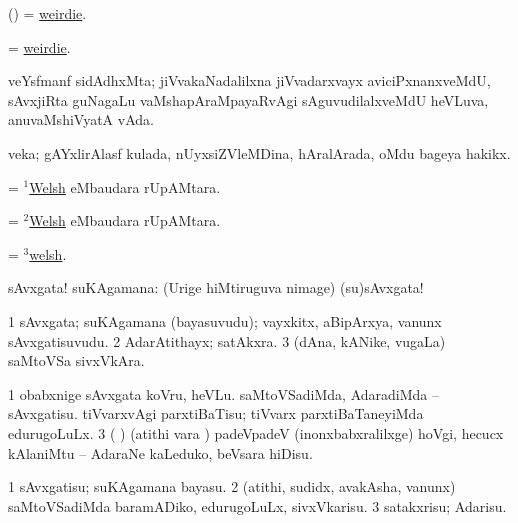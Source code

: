 \bentry
{} 
\gl{\nA}
\bmng
(\AmA) = \hyperlink{weirdie}{weirdie}. 
\emng
\eentry

\bentry
{} 
\gl{\nA}
\expl{}
\bmng
= \hyperlink{weirdie}{weirdie}. 
\emng
\eentry

\bentry
{} 
\gl{\nA}
\expl{}
\bmng
veYsfmanf sidAdhxMta; jiVvakaNadalilxna jiVvadarxvayx aviciPxnanxveMdU, sAvxjiRta guNagaLu vaMshapAraMpayaRvAgi sAguvudilalxveMdU heVLuva, anuvaMshiVyatA vAda. 
\emng
\eentry

\bentry
{} 
\gl{\nA}
\expl{}
\bmng
veka; gAYxlirAlasf kulada, nUyxsiZVleMDina, hAralArada, oMdu bageya hakikx. 
\emng
\eentry

\bentry
{} 
\gl{\gu}
\expl{}
\bmng
= \hyperlink{Welsh(1)}{$^1$Welsh} eMbaudara rUpAMtara. 
\emng
\eentry

\bentry
{} 
\gl{\nA}
\expl{}
\bmng
= \hyperlink{Welsh(2)}{$^2$Welsh} eMbaudara rUpAMtara. 
\emng
\eentry

\bentry
{} 
\gl{\akirx}
\expl{}
\bmng
= \hyperlink{welsh(3)}{$^3$welsh}. 
\emng
\eentry

\bentry
{} 
\gl{\BAavayx}
\expl{}
\bmng
sAvxgata! suKAgamana:  (Urige hiMtiruguva nimage) (su)sAvxgata! 
\emng
\eentry

\bentry
{} 
\gl{\nA}
\expl{}
\bmng
\bnum
\num{1} sAvxgata; suKAgamana (bayasuvudu); vayxkitx, aBipArxya, \mo vanunx sAvxgatisuvudu. 
\num{2} AdarAtithayx; satAkxra. 
\num{3} (dAna, kANike, \mo vugaLa) saMtoVSa sivxVkAra. 
\enum
\emng

\noindent 
\gl{\pagu}
\expl{}
\bmng
\bnum
\num{1}  obabxnige sAvxgata koVru, heVLu. 
  
\banum
{} saMtoVSadiMda, AdaradiMda -- sAvxgatisu. 
 tiVvarxvAgi parxtiBaTisu; tiVvarx parxtiBaTaneyiMda edurugoLuLx. 
\eanum
\numie
\num{3}  (   )  (atithi \mo vara \vi) padeVpadeV (inonxbabxralilxge) hoVgi, hecucx kAlaniMtu -- AdaraNe kaLeduko, beVsara hiDisu. 
\enum
\emng
\eentry

\bentry
{} 
\gl{\sakirx}
\expl{}
\bmng
\bnum
\num{1} sAvxgatisu; suKAgamana bayasu. 
\num{2} (atithi, sudidx, avakAsha, \mo vanunx) saMtoVSadiMda baramADiko, edurugoLuLx, sivxVkarisu. 
\num{3} satakxrisu; Adarisu. 
\enum
\emng
\eentry

